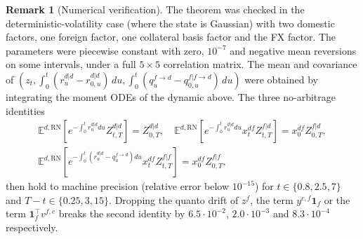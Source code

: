 \documentclass[11pt,english]{amsart}
\newcommand{\vun}{\mathbf{1}}
\newcommand{\RN}{\mathrm{RN}}
\newcommand{\EE}{\mathbb{E}}
\theoremstyle{definition}
\newtheorem{rema}{Remark}
\begin{document}
\begin{rema}[Numerical verification]
The theorem was checked in the deterministic-volatility case (where the state is Gaussian) with two domestic factors, one foreign factor, one collateral basis factor and the FX factor. The parameters were piecewise constant with zero, $10^{-7}$ and negative mean reversions on some intervals, under a full $5\times 5$ correlation matrix. The mean and covariance of $(z_t, \int_0^t (r^{d|d}_u - r^{d|d}_{0,u})\,du, \int_0^t (q^{f\to d}_u - q^{f|f\to d}_{0,u})\,du)$ were obtained by integrating the moment ODEs of the dynamic above. The three no-arbitrage identities
\begin{eqnarray*}
  \EE^{d,\RN}\left[e^{-\int_0^t r^{d|d}_u du} Z^{d|d}_{t,T}\right] = Z^{d|d}_{0,T} , \quad
  \EE^{d,\RN}\left[e^{-\int_0^t r^{d|d}_u du} x^{df}_t Z^{f|d}_{t,T}\right] = x^{df}_0 Z^{f|d}_{0,T} , \\
  \EE^{d,\RN}\left[e^{-\int_0^t (r^{d|d}_u - q^{f\to d}_u) du} x^{df}_t Z^{f|f}_{t,T}\right] = x^{df}_0 Z^{f|f}_{0,T} ,
\end{eqnarray*}
then hold to machine precision (relative error below $10^{-15}$) for $t\in\{0.8,2.5,7\}$ and $T-t\in\{0.25,3,15\}$. Dropping the quanto drift of $z^f$, the term $y^{c,f}\vun_f$ or the term $\vun_f^\top v^{f,c}$ breaks the second identity by $6.5\cdot 10^{-2}$, $2.0\cdot 10^{-3}$ and $8.3\cdot 10^{-4}$ respectively.
\end{rema}


\newpage%
\end{document}
